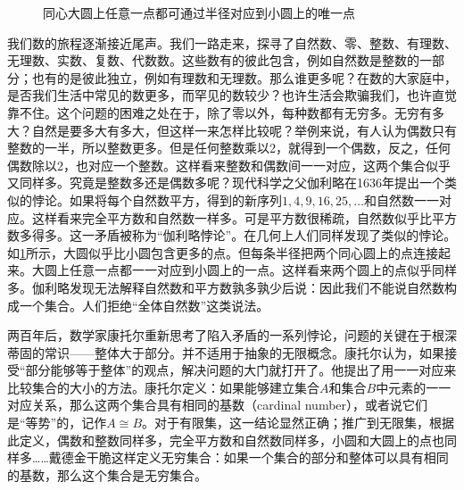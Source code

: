 \documentclass[b5paper]{ctexart}
\begin{document}
\begin{figure}[htbp]
 \centering

 \caption{同心大圆上任意一点都可通过半径对应到小圆上的唯一点}
 \label{fig:circles-paradox}
\end{figure}

我们数的旅程逐渐接近尾声。我们一路走来，探寻了自然数、零、整数、有理数、无理数、实数、复数、代数数。这些数有的彼此包含，例如自然数是整数的一部分；也有的是彼此独立，例如有理数和无理数。那么谁更多呢？在数的大家庭中，是否我们生活中常见的数更多，而罕见的数较少？也许生活会欺骗我们，也许直觉靠不住。这个问题的困难之处在于，除了零以外，每种数都有无穷多。无穷有多大？自然是要多大有多大，但这样一来怎样比较呢？举例来说，有人认为偶数只有整数的一半，所以整数更多。但是任何整数乘以2，就得到一个偶数，反之，任何偶数除以2，也对应一个整数。这样看来整数和偶数间一一对应，这两个集合似乎又同样多。究竟是整数多还是偶数多呢？现代科学之父伽利略在1636年提出一个类似的悖论。如果将每个自然数平方，得到的新序列$1, 4, 9, 16, 25, \dotsc$和自然数一一对应。这样看来完全平方数和自然数一样多。可是平方数很稀疏，自然数似乎比平方数多得多。这一矛盾被称为“伽利略悖论”。在几何上人们同样发现了类似的悖论。如\cref{fig:circles-paradox}所示，大圆似乎比小圆包含更多的点。但每条半径把两个同心圆上的点连接起来。大圆上任意一点都一一对应到小圆上的一点。这样看来两个圆上的点似乎同样多。伽利略发现无法解释自然数和平方数孰多孰少后说：因此我们不能说自然数构成一个集合。人们拒绝“全体自然数”这类说法。

两百年后，数学家康托尔重新思考了陷入矛盾的一系列悖论，问题的关键在于根深蒂固的常识——整体大于部分。并不适用于抽象的无限概念。康托尔认为，如果接受“部分能够等于整体”的观点，解决问题的大门就打开了。他提出了用一一对应来比较集合的大小的方法。康托尔定义：如果能够建立集合$A$和集合$B$中元素的一一对应关系，那么这两个集合具有相同的基数（cardinal number），或者说它们是“等势”的，记作$A \cong B$。对于有限集，这一结论显然正确；推广到无限集，根据此定义，偶数和整数同样多，完全平方数和自然数同样多，小圆和大圆上的点也同样多……戴德金干脆这样定义无穷集合：如果一个集合的部分和整体可以具有相同的基数，那么这个集合是无穷集合\cite{Dedekind-1858}。
\end{document}
